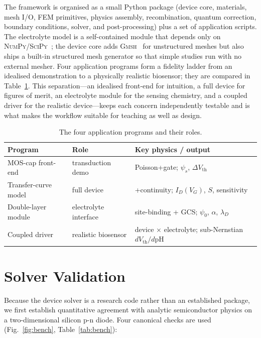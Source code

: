 \documentclass[10pt,journal]{IEEEtran}
\begin{document}
The framework is organised as a small Python package (device core, materials,
mesh I/O, FEM primitives, physics assembly, recombination, quantum correction,
boundary conditions, solver, and post-processing) plus a set of application
scripts. The electrolyte model is a self-contained module that depends only on
\textsc{NumPy}/\textsc{SciPy}~\cite{harris2020,virtanen2020}; the device core adds
\textsc{Gmsh}~\cite{geuzaine2009} for unstructured meshes but also ships a
built-in structured mesh generator so that simple studies run with no external
mesher. Four application programs form a fidelity ladder from an idealised
demonstration to a physically realistic biosensor; they are compared in
Table~\ref{tab:programs}. This separation---an idealised front-end for intuition,
a full device for figures of merit, an electrolyte module for the sensing
chemistry, and a coupled driver for the realistic device---keeps each concern
independently testable and is what makes the workflow suitable for teaching as
well as design.

\begin{table}[t]
\centering
\caption{The four application programs and their roles.}
\label{tab:programs}
\footnotesize
\renewcommand{\arraystretch}{1.25}
\begin{tabular}{@{}p{1.9cm}p{2.0cm}p{3.0cm}@{}}
\toprule
Program & Role & Key physics / output \\
\midrule
MOS-cap front-end & transduction demo & Poisson+gate; $\psi_s$, $\Delta V_{\mathrm{th}}$ \\
Transfer-curve model & full device & +continuity; $I_D(V_G)$, $S$, sensitivity \\
Double-layer module & electrolyte interface & site-binding + GCS; $\psi_0$, $\alpha$, $\lambda_D$ \\
Coupled driver & realistic biosensor & device $\times$ electrolyte; sub-Nernstian $dV_{\mathrm{th}}/d\mathrm{pH}$ \\
\bottomrule
\end{tabular}
\end{table}

\section{Solver Validation}
\label{sec:valid}

Because the device solver is a research code rather than an established package,
we first establish quantitative agreement with analytic semiconductor physics on
a two-dimensional silicon p-n diode. Four canonical checks are used
(Fig.~\ref{fig:bench}, Table~\ref{tab:bench}):
\end{document}
